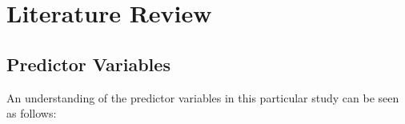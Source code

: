 %
%


\section{Literature Review}
\subsection{Predictor Variables}
\noindent An understanding of the predictor variables in this particular study can be seen as follows:

